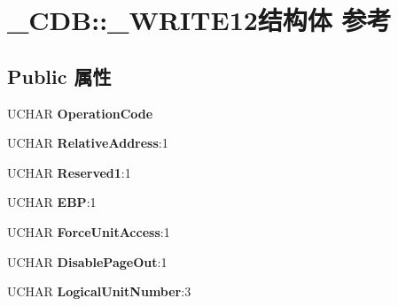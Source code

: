 \hypertarget{struct___c_d_b_1_1___w_r_i_t_e12}{}\section{\+\_\+\+C\+DB\+:\+:\+\_\+\+W\+R\+I\+T\+E12结构体 参考}
\label{struct___c_d_b_1_1___w_r_i_t_e12}
\subsection*{Public 属性}
\begin{DoxyCompactItemize}
\item 
\mbox{\label{struct___c_d_b_1_1___w_r_i_t_e12_ae88965ac8ae9d6b2ee4859757dfc50e4}} 
U\+C\+H\+AR {\bfseries Operation\+Code}
\item 
\mbox{\label{struct___c_d_b_1_1___w_r_i_t_e12_a5b4f6aec611e96891e7b0e56862434a2}} 
U\+C\+H\+AR {\bfseries Relative\+Address}\+:1
\item 
\mbox{\label{struct___c_d_b_1_1___w_r_i_t_e12_acc64845d5bedf5e10355cd122c24e9ff}} 
U\+C\+H\+AR {\bfseries Reserved1}\+:1
\item 
\mbox{\label{struct___c_d_b_1_1___w_r_i_t_e12_a58e2461285d8e55e817648236a25d29f}} 
U\+C\+H\+AR {\bfseries E\+BP}\+:1
\item 
\mbox{\label{struct___c_d_b_1_1___w_r_i_t_e12_a73f1aaae3b5d42ea077c08a328a9af68}} 
U\+C\+H\+AR {\bfseries Force\+Unit\+Access}\+:1
\item 
\mbox{\label{struct___c_d_b_1_1___w_r_i_t_e12_a2a0044debc1f6ccf7206d6dbcc5dabe3}} 
U\+C\+H\+AR {\bfseries Disable\+Page\+Out}\+:1
\item 
\mbox{\label{struct___c_d_b_1_1___w_r_i_t_e12_a16ebf2ff154eff8e55e3e5eee7eec32d}} 
U\+C\+H\+AR {\bfseries Logical\+Unit\+Number}\+:3
\item 
\mbox{\label{struct___c_d_b_1_1___w_r_i_t_e12_a47f28c5d4658c54af2bbc5a3c02454a7}} 

\end{DoxyCompactItemize}
